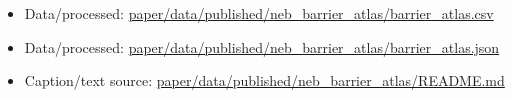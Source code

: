 \begin{itemize}[leftmargin=1.4em,noitemsep]
\item Data/processed: \begingroup\scriptsize\url{paper/data/published/neb_barrier_atlas/barrier_atlas.csv}\endgroup
\item Data/processed: \begingroup\scriptsize\url{paper/data/published/neb_barrier_atlas/barrier_atlas.json}\endgroup
\item Caption/text source: \begingroup\scriptsize\url{paper/data/published/neb_barrier_atlas/README.md}\endgroup
\end{itemize}
